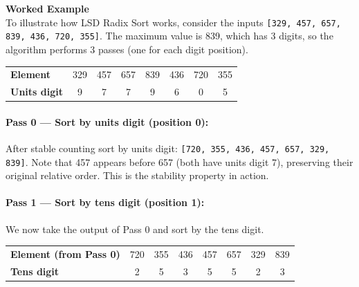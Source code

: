 \documentclass[12pt]{article}
\begin{document}
\newpage
\noindent\textbf{Worked Example}\\

To illustrate how LSD Radix Sort works, consider the inputs \texttt{[329, 457, 657, 839, 436, 720, 355]}. The maximum value is 839, which has 3 digits, so
the algorithm performs 3 passes (one for each digit position).

\begin{table}[h]
\centering
\renewcommand{\arraystretch}{1.2}
\begin{tabular}{@{}lccccccc@{}}
\toprule
\textbf{Element}     & 329 & 457 & 657 & 839 & 436 & 720 & 355 \\
\textbf{Units digit} & 9   & 7   & 7   & 9   & 6   & 0   & 5   \\
\bottomrule
\end{tabular}
\end{table}

\paragraph{Pass 0 — Sort by units digit (position 0):}

After stable counting sort by units digit: \texttt{[720, 355, 436, 457, 657, 329, 839]}. Note that 457 appears before 657 (both have units digit 7), preserving their original relative order. This is the stability property in action.


\paragraph{Pass 1 — Sort by tens digit (position 1):}

We now take the output of Pass 0 and sort by the tens digit.

\begin{table}[h]
\centering
\renewcommand{\arraystretch}{1.2}
\begin{tabular}{@{}lccccccc@{}}
\toprule
\textbf{Element (from Pass 0)} & 720 & 355 & 436 & 457 & 657 & 329 & 839 \\
\textbf{Tens digit}            & 2   & 5   & 3   & 5   & 5   & 2   & 3   \\
\bottomrule
\end{tabular}
\end{table}
\end{document}
